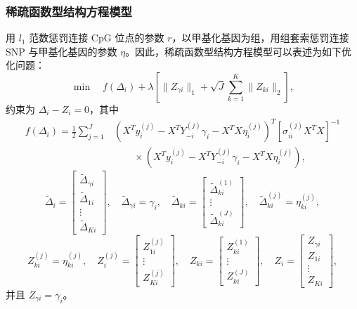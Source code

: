 \subsubsection{稀疏函数型结构方程模型}

用 $l_1$ 范数惩罚连接 CpG 位点的参数 $r$，以甲基化基因为组，用组套索惩罚连接 SNP 与甲基化基因的参数 $\eta$。因此，稀疏函数型结构方程模型可以表述为如下优化问题：
\begin{equation}
\min\quad f(\Delta_i)+\lambda\left[\lVert Z_{\gamma i}\rVert_1
+\sqrt J\sum_{k=1}^K\lVert Z_{ki}\rVert_2\right],
\tag{5.95}
\end{equation}
约束为 $\Delta_i-Z_i=0$，其中
\[
\begin{aligned}
f(\Delta_i)=\frac12\sum_{j=1}^J{}&
(X^Ty_i^{(j)}-X^TY_{-i}^{(j)}\gamma_i-X^TX\eta_i^{(j)})^T
[\sigma_{ii}^{(j)}X^TX]^{-1}\\
&\qquad\times(X^Ty_i^{(j)}-X^TY_{-i}^{(j)}\gamma_i-X^TX\eta_i^{(j)}),
\end{aligned}
\]
\[
\widetilde\Delta_i=\begin{bmatrix}\widetilde\Delta_{\gamma i}\\\widetilde\Delta_{1i}\\\vdots\\\widetilde\Delta_{Ki}\end{bmatrix},\quad
\widetilde\Delta_{\gamma i}=\gamma_i,\quad
\widetilde\Delta_{ki}=\begin{bmatrix}\widetilde\Delta_{ki}^{(1)}\\\vdots\\\widetilde\Delta_{ki}^{(J)}\end{bmatrix},\quad
\widetilde\Delta_{ki}^{(j)}=\eta_{ki}^{(j)},
\]
\[
Z_{ki}^{(j)}=\eta_{ki}^{(j)},\quad
Z_i^{(j)}=\begin{bmatrix}Z_{1i}^{(j)}\\\vdots\\Z_{Ki}^{(j)}\end{bmatrix},\quad
Z_{ki}=\begin{bmatrix}Z_{ki}^{(1)}\\\vdots\\Z_{ki}^{(J)}\end{bmatrix},\quad
Z_i=\begin{bmatrix}Z_{\gamma i}\\Z_{1i}\\\vdots\\Z_{Ki}\end{bmatrix},
\]
并且 $Z_{\gamma i}=\gamma_i$。

